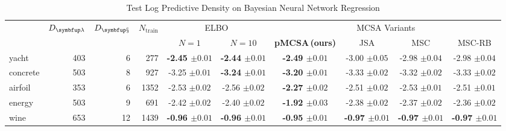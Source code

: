 
\begin{table*}
  \vspace{-0.2in}
  \centering
  \caption{Test Log Predictive Density on Bayesian Neural Network Regression}\label{table:bnn}
  \vspace{-0.05in}
  \setlength{\tabcolsep}{2pt}
  \begin{threeparttable}
  \begin{tabular}{lrrrcccccc}
    \toprule
    & \multicolumn{1}{c}{\multirow{2}{*}{\(D_{\mathcal{\vlambda}}\)}} & \multicolumn{1}{c}{\multirow{2}{*}{\(D_{\mathcal{\vx}}\)}} &  \multicolumn{1}{c}{\multirow{2}{*}{\(N_{\text{train}}\)}} & \multicolumn{2}{c}{\multirow{1}{*}{ELBO}} & \multicolumn{4}{c}{MCSA Variants} \\\cmidrule(lr){5-6}\cmidrule(lr){7-10}
  & & & & {\footnotesize\(N=1\)} & {\footnotesize\(N=10\)} & \multicolumn{1}{c}{\multirow{1}{*}{\footnotesize{\textbf{pMCSA{\scriptsize\,(ours)}}}}} & \multicolumn{1}{c}{\multirow{1}{*}{\footnotesize{JSA}}} & \multicolumn{1}{c}{\multirow{1}{*}{\footnotesize{MSC}}} & \multicolumn{1}{c}{\multirow{1}{*}{\footnotesize{MSC-RB}}}\\
    \midrule
    \textsf{yacht} & 403 & 6 & 277 & {\bf-2.45 {\scriptsize{\(\pm 0.01\)}}} & {\bf-2.44 {\scriptsize{\(\pm 0.01\)}}} & {\bf-2.49 {\scriptsize{\(\pm 0.01\)}}} & {-3.00 {\scriptsize{\(\pm 0.05\)}}} & {-2.98 {\scriptsize{\(\pm 0.04\)}}} & {-2.98 {\scriptsize{\(\pm 0.04\)}}}\\
    \textsf{concrete} & 503 & 8 & 927 & {-3.25 {\scriptsize{\(\pm 0.01\)}}} & {\bf-3.24 {\scriptsize{\(\pm 0.01\)}}} & {\bf-3.20 {\scriptsize{\(\pm 0.01\)}}} & {-3.33 {\scriptsize{\(\pm 0.02\)}}} & {-3.32 {\scriptsize{\(\pm 0.02\)}}} & {-3.33 {\scriptsize{\(\pm 0.02\)}}}\\
    \textsf{airfoil} & 353 & 6 & 1352 & {-2.53 {\scriptsize{\(\pm 0.02\)}}} & {-2.56 {\scriptsize{\(\pm 0.02\)}}} & {\bf-2.27 {\scriptsize{\(\pm 0.02\)}}} & {-2.51 {\scriptsize{\(\pm 0.02\)}}} & {-2.53 {\scriptsize{\(\pm 0.01\)}}} & {-2.51 {\scriptsize{\(\pm 0.01\)}}}\\
    \textsf{energy} & 503 & 9 & 691 & {-2.42 {\scriptsize{\(\pm 0.02\)}}} & {-2.40 {\scriptsize{\(\pm 0.02\)}}} & {\bf-1.92 {\scriptsize{\(\pm 0.03\)}}} & {-2.38 {\scriptsize{\(\pm 0.02\)}}} & {-2.37 {\scriptsize{\(\pm 0.02\)}}} & {-2.36 {\scriptsize{\(\pm 0.02\)}}}\\
    \textsf{wine} & 653 & 12 & 1439 & {\bf-0.96 {\scriptsize{\(\pm 0.01\)}}} & {\bf-0.96 {\scriptsize{\(\pm 0.01\)}}} & {\bf-0.95 {\scriptsize{\(\pm 0.01\)}}} & {\bf-0.97 {\scriptsize{\(\pm 0.01\)}}} & {\bf-0.97 {\scriptsize{\(\pm 0.01\)}}} & {\bf-0.97 {\scriptsize{\(\pm 0.01\)}}} \\

\end{tabular}
\end{threeparttable}
\end{table*}
